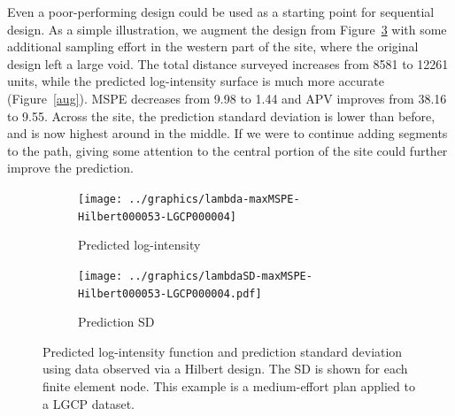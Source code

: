 \documentclass[review]{elsarticle}
\begin{document}
Even a poor-performing design could be used as a starting point for sequential
design. As a simple illustration, we augment the design from
Figure~\ref{hilb000053lgcp} with some additional sampling effort in the western
part of the site, where the original design left a large void.
The total distance surveyed increases from 8581 to 12261 units, while the
predicted log-intensity surface is much more accurate (Figure~\ref{aug}).
MSPE decreases from 9.98 to 1.44 and APV improves from 38.16 to 9.55.
Across the site, the prediction standard deviation is lower than before, and
is now highest around in the middle. If we were to continue adding segments to
the path, giving some attention to the central portion of the site could further
improve the prediction.

\begin{figure}

\begin{subfigure}{5in}
\texttt{[image: ../graphics/lambda-maxMSPE-Hilbert000053-LGCP000004]}
\caption{Predicted log-intensity}
\label{lambdahilb000053lgcp}
\end{subfigure}

\begin{subfigure}{5in}
\texttt{[image: ../graphics/lambdaSD-maxMSPE-Hilbert000053-LGCP000004.pdf]}
\caption{Prediction SD}
\label{sdhilb000053lgcp}
\end{subfigure}

\caption{Predicted log-intensity function and prediction standard deviation
using data observed via a Hilbert design. The SD is shown for each finite
element node. This example is a medium-effort plan applied to a LGCP dataset.}
\label{hilb000053lgcp}
\end{figure}
\end{document}
